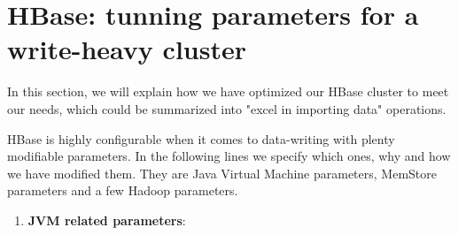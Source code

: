 \section{HBase: tunning parameters for a write-heavy cluster}

In this section, we will explain how we have optimized our HBase cluster to meet our needs, which could be summarized into "excel in importing data" operations.
\par
HBase is highly configurable when it comes to data-writing with plenty modifiable parameters. In the following lines we specify which ones, why and how we have modified them. They are Java Virtual Machine parameters, MemStore parameters and a few Hadoop parameters.

\begin{enumerate}

\item \textbf{JVM related parameters}:
\bigskip


\end{enumerate}
